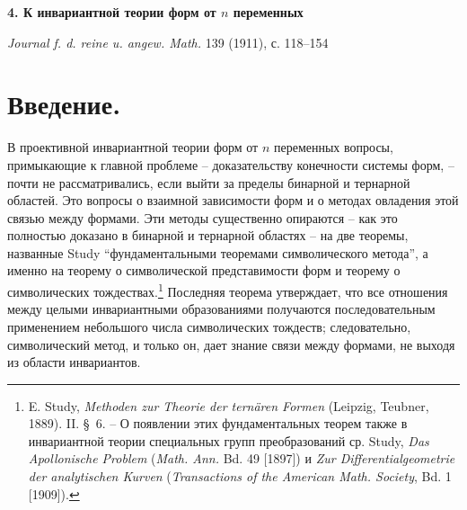 \documentclass[11pt]{article}
\begin{document}
\begin{center}
{\Large\bfseries 4. К инвариантной теории форм от $n$ переменных}\par
\vspace{1.2em}
\emph{Journal f. d. reine u. angew. Math.} 139 (1911), с. 118--154
\end{center}

\section*{Введение.}
В проективной инвариантной теории форм от $n$ переменных вопросы, примыкающие к главной проблеме -- доказательству конечности системы форм, -- почти не рассматривались, если выйти за пределы бинарной и тернарной областей. Это вопросы о взаимной зависимости форм и о методах овладения этой связью между формами. Эти методы существенно опираются -- как это полностью доказано в бинарной и тернарной областях -- на две теоремы, названные Study ``фундаментальными теоремами символического метода'', а именно на теорему о символической представимости форм и теорему о символических тождествах.\footnote{E. Study, \emph{Methoden zur Theorie der ternären Formen} (Leipzig, Teubner, 1889). II. \S\ 6. -- О появлении этих фундаментальных теорем также в инвариантной теории специальных групп преобразований ср. Study, \emph{Das Apollonische Problem} (\emph{Math. Ann.} Bd. 49 [1897]) и \emph{Zur Differentialgeometrie der analytischen Kurven} (\emph{Transactions of the American Math. Society}, Bd. 1 [1909]).} Последняя теорема утверждает, что все отношения между целыми инвариантными образованиями получаются последовательным применением небольшого числа символических тождеств; следовательно, символический метод, и только он, дает знание связи между формами, не выходя из области инвариантов.
\end{document}
